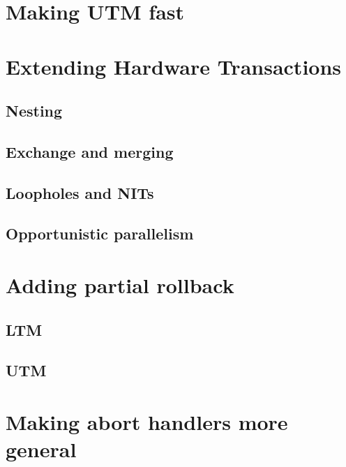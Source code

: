 \section{Making UTM fast}

\section{Extending Hardware Transactions}
\subsection{Nesting}
\subsection{Exchange and merging}
\subsection{Loopholes and NITs}\label{sec:nit}
\subsection{Opportunistic parallelism}



\section{Adding partial rollback}
\subsection{LTM}

\subsection{UTM}

\section{Making abort handlers more general}

